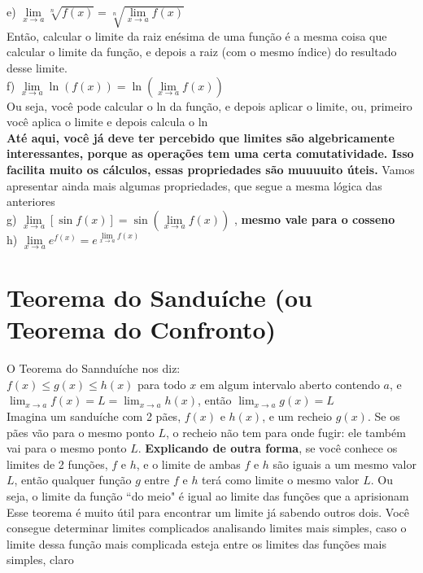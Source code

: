 \documentclass{article}
\begin{document}
\begin{enumerate}
\begin{flushleft}
e) \quad $\lim\limits_{x \to a} \sqrt[n]{f(x)} = \sqrt[n]{\lim\limits_{x \to a} f(x)}$ \\[10pt] Então, calcular o limite da raiz enésima de uma função é a mesma coisa que calcular o limite da função, e depois a raiz (com o mesmo índice) do resultado desse limite. \\[10pt]
f) \quad $\lim\limits_{x \to a} \ln(f(x)) = \ln\left(\lim\limits_{x \to a} f(x)\right)$ \\[10pt] Ou seja, você pode calcular o ln da função, e depois aplicar o limite, ou, primeiro você aplica o limite e depois calcula o ln\\[10pt]
\textbf{Até aqui, você já deve ter percebido que limites são algebricamente interessantes, porque as operações tem uma certa comutatividade. Isso facilita muito os cálculos, essas propriedades são muuuuito úteis.} Vamos apresentar ainda mais algumas propriedades, que segue a mesma lógica das anteriores\\[10pt]
g) \quad $\lim\limits_{x \to a} [\sin f(x)] = \sin \left(\lim\limits_{x \to a} f(x)\right)$ , \textbf{mesmo vale para o cosseno}\\[10pt]
h) \quad $\lim\limits_{x \to a} e^{f(x)} = e^{\lim\limits_{x \to a} f(x)}$
\end{flushleft}
    
\end{enumerate}

\section{Teorema do Sanduíche (ou Teorema do Confronto)}
O Teorema do Sannduíche nos diz:
\\[10pt]
$f(x) \leq g(x) \leq h(x)$ para todo $x$ em algum intervalo aberto contendo $a$, e $\displaystyle \lim_{x \to a} f(x) = L = \displaystyle \lim_{x \to a} h(x)$, então $\displaystyle \lim_{x \to a} g(x) = L$
\\[10pt]
Imagina um sanduíche com 2 pães, $f(x)$ e $h(x)$, e um recheio $g(x)$. Se os pães vão para o mesmo ponto $L$, o recheio não tem para onde fugir: ele também vai para o mesmo ponto $L$. \textbf{Explicando de outra forma}, se você conhece os limites de 2 funções, $f$ e $h$, e o limite de ambas $f$ e $h$ são iguais a um mesmo valor $L$, então qualquer função $g$ entre $f$ e $h$ terá como limite o mesmo valor $L$. Ou seja, o limite da função ``do meio" é igual ao limite das funções que a aprisionam
\\[10pt]
Esse teorema é muito útil para encontrar um limite já sabendo outros dois. Você consegue determinar limites complicados analisando limites mais simples, caso o limite dessa função mais complicada esteja entre os limites das funções mais simples, claro
\end{document}
